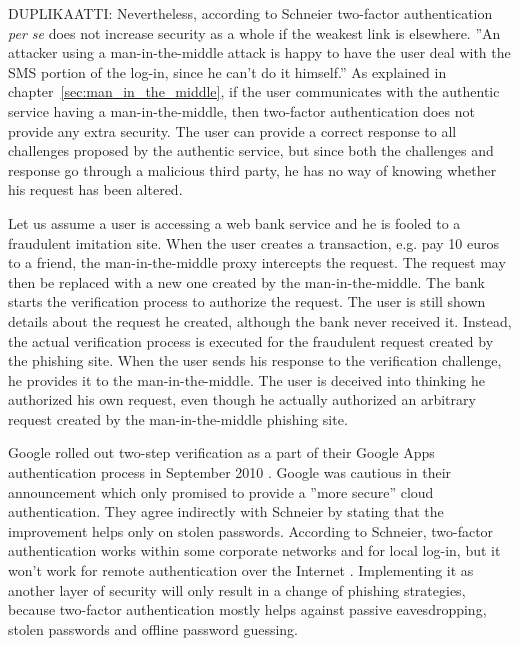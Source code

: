 \documentclass[english,gradu]{tktltiki}
\begin{document}
             DUPLIKAATTI:
             Nevertheless, according to Schneier \cite{schneier_2factor_2005} two-factor authentication \emph{per se} does not increase security as a whole if the weakest link is elsewhere. ''An attacker using a man-in-the-middle attack is happy to have the user deal with the SMS portion of the log-in, since he can’t do it himself.'' \cite{schneier_2factor_2005} As explained in chapter~\ref{sec:man_in_the_middle}, if the user communicates with the authentic service having a man-in-the-middle, then two-factor authentication does not provide any extra security. The user can provide a correct response to all challenges proposed by the authentic service, but since both the challenges and response go through a malicious third party, he has no way of knowing whether his request has been altered.

             Let us assume a user is accessing a web bank service and he is fooled to a fraudulent imitation site. When the user creates a transaction, e.g. pay 10 euros to a friend, the man-in-the-middle proxy intercepts the request. The request may then be replaced with a new one created by the man-in-the-middle. The bank starts the verification process to authorize the request. The user is still shown details about the request he created, although the bank never received it. Instead, the actual verification process is executed for the fraudulent request created by the phishing site. When the user sends his response to the verification challenge, he provides it to the man-in-the-middle. The user is deceived into thinking he authorized his own request, even though he actually authorized an arbitrary request created by the man-in-the-middle phishing site.

             Google rolled out two-step verification as a part of their Google Apps authentication process in September 2010 \cite{google_2step_2010}. Google was cautious in their announcement which only promised to provide a ''more secure'' cloud authentication. They agree indirectly with Schneier \cite{schneier_2factor_2005} by stating that the improvement helps only on stolen passwords. According to Schneier, two-factor authentication works within some corporate networks and for local log-in, but it won't work for remote authentication over the Internet \cite{schneier_2factor_2005}. Implementing it as another layer of security will only result in a change of phishing strategies, because two-factor authentication mostly helps against passive eavesdropping, stolen passwords and offline password guessing.
\end{document}
